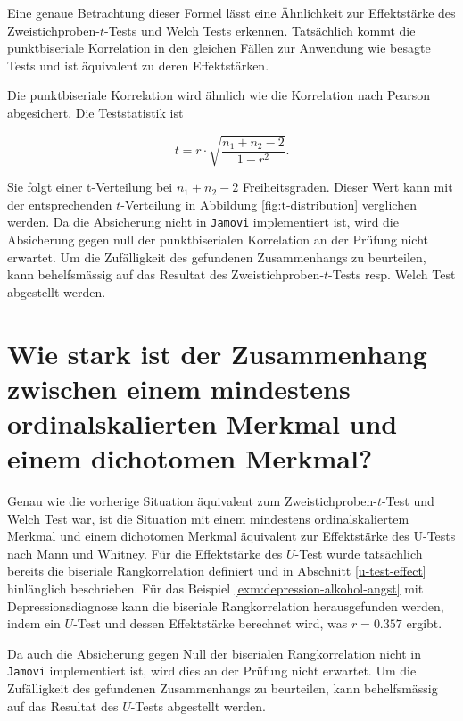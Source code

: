 \documentclass[
]{book}
\theoremstyle{definition}
\theoremstyle{definition}
\theoremstyle{definition}
\theoremstyle{definition}
\theoremstyle{remark}
\begin{document}
Eine genaue Betrachtung dieser Formel lässt eine Ähnlichkeit zur Effektstärke des Zweistichproben-\(t\)-Tests und Welch Tests erkennen. Tatsächlich kommt die punktbiseriale Korrelation in den gleichen Fällen zur Anwendung wie besagte Tests und ist äquivalent zu deren Effektstärken.

Die punktbiseriale Korrelation wird ähnlich wie die Korrelation nach Pearson abgesichert. Die Teststatistik ist

\begin{equation}
t = r\cdot \sqrt{\frac{n_1 + n_2 -2}{1-r^2}}.
\end{equation}

Sie folgt einer t-Verteilung bei \(n_1 + n_2 -2\) Freiheitsgraden. Dieser Wert kann mit der entsprechenden \(t\)-Verteilung in Abbildung \ref{fig:t-distribution} verglichen werden. Da die Absicherung nicht in \texttt{Jamovi} implementiert ist, wird die Absicherung gegen null der punktbiserialen Korrelation an der Prüfung nicht erwartet. Um die Zufälligkeit des gefundenen Zusammenhangs zu beurteilen, kann behelfsmässig auf das Resultat des Zweistichproben-\(t\)-Tests resp. Welch Test abgestellt werden.

\section{Wie stark ist der Zusammenhang zwischen einem mindestens ordinalskalierten Merkmal und einem dichotomen Merkmal?}\label{wie-stark-ist-der-zusammenhang-zwischen-einem-mindestens-ordinalskalierten-merkmal-und-einem-dichotomen-merkmal}

Genau wie die vorherige Situation äquivalent zum Zweistichproben-\(t\)-Test und Welch Test war, ist die Situation mit einem mindestens ordinalskaliertem Merkmal und einem dichotomen Merkmal äquivalent zur Effektstärke des U-Tests nach Mann und Whitney. Für die Effektstärke des \(U\)-Test wurde tatsächlich bereits die biseriale Rangkorrelation definiert und in Abschnitt \ref{u-test-effect} hinlänglich beschrieben. Für das Beispiel \ref{exm:depression-alkohol-angst} mit Depressionsdiagnose kann die biseriale Rangkorrelation herausgefunden werden, indem ein \(U\)-Test und dessen Effektstärke berechnet wird, was \(r = 0.357\) ergibt.

Da auch die Absicherung gegen Null der biserialen Rangkorrelation nicht in \texttt{Jamovi} implementiert ist, wird dies an der Prüfung nicht erwartet. Um die Zufälligkeit des gefundenen Zusammenhangs zu beurteilen, kann behelfsmässig auf das Resultat des \(U\)-Tests abgestellt werden.
\end{document}
